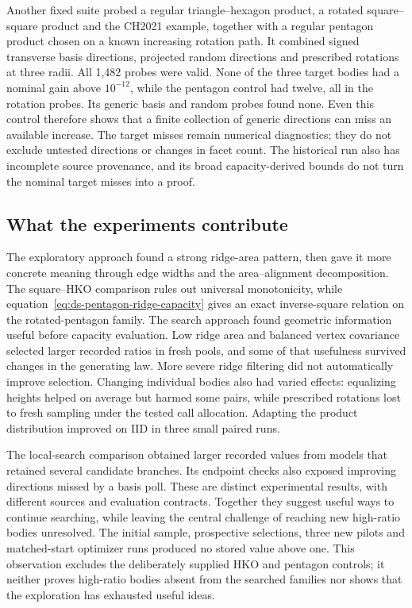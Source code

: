 Another fixed suite probed a regular triangle--hexagon product, a rotated
square--square product and the CH2021 example, together with a regular
pentagon product chosen on a known increasing rotation path. It combined
signed transverse basis directions, projected random directions and
prescribed rotations at three radii. All 1,482 probes were valid. None of
the three target bodies had a nominal gain above $10^{-12}$, while the
pentagon control had twelve, all in the rotation probes. Its generic basis
and random probes found none. Even this control therefore shows that a
finite collection of generic directions can miss an available increase.
The target misses remain numerical diagnostics; they do not exclude
untested directions or changes in facet count. The historical run also has
incomplete source provenance, and its broad capacity-derived bounds do not
turn the nominal target misses into a proof.

\subsection{What the experiments contribute}

The exploratory approach found a strong ridge-area pattern, then gave it
more concrete meaning through edge widths and the area--alignment
decomposition. The square--HKO comparison rules out universal monotonicity,
while equation~\ref{eq:ds-pentagon-ridge-capacity} gives an exact inverse-square
relation on the rotated-pentagon family. The search
approach found geometric information useful before capacity evaluation. Low ridge area and balanced vertex covariance selected larger
recorded ratios in fresh pools, and some of that usefulness survived changes
in the generating law. More severe ridge filtering did not automatically
improve selection. Changing individual bodies also had varied effects:
equalizing heights helped on average but harmed some pairs, while prescribed
rotations lost to fresh sampling under the tested call allocation. Adapting
the product distribution improved on IID in three small paired runs.

The local-search comparison obtained larger recorded values from models
that retained several candidate branches. Its endpoint checks also exposed
improving directions missed by a basis poll. These are distinct experimental
results, with different sources and evaluation contracts. Together they
suggest useful ways to continue searching, while leaving the central
challenge of reaching new high-ratio bodies unresolved. The initial sample, prospective selections, three new pilots and matched-start
optimizer runs produced no stored value above one. This observation excludes
the deliberately supplied HKO and pentagon controls; it neither proves
high-ratio bodies absent from the searched families nor shows that the
exploration has exhausted useful ideas.

